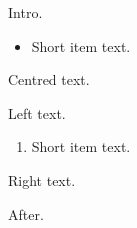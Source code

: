 \documentclass[10pt]{article}
\begin{document}
Intro.
\begin{itemize}
\item Short item text.
\end{itemize}
\begin{center}
Centred text.
\end{center}
\begin{flushleft}
Left text.
\end{flushleft}
\begin{enumerate}
\item Short item text.
\end{enumerate}
\begin{flushright}
Right text.
\end{flushright}
After.
\end{document}
